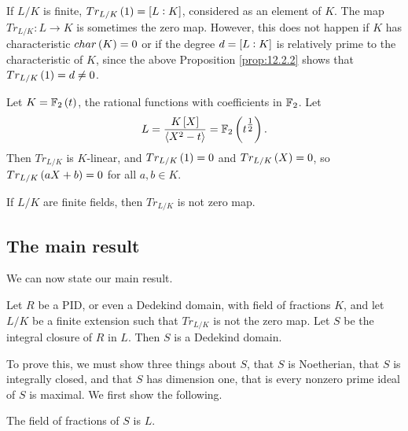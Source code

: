 \pagebreak

\begin{remark}
If $ L / K $ is finite, $ Tr_{L / K}\br{1} = \sbr{L : K} $, considered as an element of $ K $. The map $ Tr_{L / K} : L \to K $ is sometimes the zero map. However, this does not happen if $ K $ has characteristic $ char\br{K} = 0 $ or if the degree $ d = \sbr{L : K} $ is relatively prime to the characteristic of $ K $, since the above Proposition \ref{prop:12.2.2} shows that $ Tr_{L / K}\br{1} = d \ne 0 $.
\end{remark}

\begin{example*}
Let $ K = \F_2\br{t} $, the rational functions with coefficients in $ \mathbb{F}_2 $. Let
$$ L = \dfrac{K\sbr{X}}{\abr{X^2 - t}} = \F_2\br{t^{\tfrac{1}{2}}}. $$
Then $ Tr_{L / K} $ is $ K $-linear, and $ Tr_{L / K}\br{1} = 0 $ and $ Tr_{L / K}\br{X} = 0 $, so $ Tr_{L / K}\br{aX + b} = 0 $ for all $ a, b \in K $.
\end{example*}

\begin{proposition}
If $ L / K $ are finite fields, then $ Tr_{L / K} $ is not zero map.
\end{proposition}

\subsection{The main result}

We can now state our main result.

\begin{theorem}
Let $ R $ be a PID, or even a Dedekind domain, with field of fractions $ K $, and let $ L / K $ be a finite extension such that $ Tr_{L / K} $ is not the zero map. Let $ S $ be the integral closure of $ R $ in $ L $. Then $ S $ is a Dedekind domain.
\end{theorem}

To prove this, we must show three things about $ S $, that $ S $ is Noetherian, that $ S $ is integrally closed, and that $ S $ has dimension one, that is every nonzero prime ideal of $ S $ is maximal. We first show the following.

\begin{lemma}
The field of fractions of $ S $ is $ L $.
\end{lemma}

